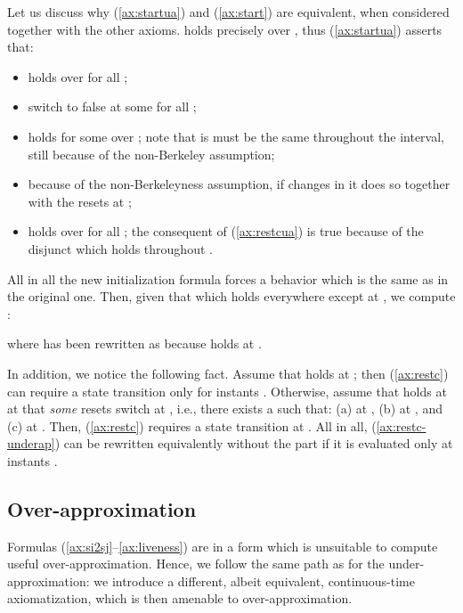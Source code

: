\documentclass[a4paper]{article}
\newcommand{\frf}[1]{(\ref{#1})}
\newcommand{\fsrf}[2]{(\ref{#1}--\ref{#2})}
\theoremstyle{plain}
\theoremstyle{definition}
\begin{document}
Let us discuss why \frf{ax:startua} and \frf{ax:start} are equivalent, when considered together with the other axioms.
 holds precisely over , thus \frf{ax:startua} asserts that:
\begin{itemize}
  \item  holds over  for all ;
  \item  switch to false at some  for all ;
  \item  holds for some  over ;
	 note that is must be the same  throughout the interval, still because of the non-Berkeley assumption;
  \item because of the non-Berkeleyness assumption, if  changes in  it does so together with the resets at ;
  \item  holds over  for all ; the consequent of \frf{ax:restcua} is true because of the disjunct  which holds throughout .
\end{itemize}
All in all the new initialization formula forces a behavior which is the same as in the original one.
Then, given that  which holds everywhere except at , we compute :

where  has been rewritten as  because  holds at .

In addition, we notice the following fact.
Assume that  holds at ; then \frf{ax:restc} can require a state transition only for instants .
Otherwise, assume that  holds at  at that \emph{some} resets switch at , i.e., there exists a  such that: (a)  at , (b)  at , and (c)  at .
Then, \frf{ax:restc} requires a state transition at .
All in all, \frf{ax:restc-underap} can be rewritten equivalently without the  part if it is evaluated only at instants .





\subsection{Over-ap\-prox\-i\-ma\-tion}
Formulas \fsrf{ax:si2sj}{ax:liveness} are in a form which is unsuitable to compute useful over-ap\-prox\-i\-ma\-tion.
Hence, we follow the same path as for the under-ap\-prox\-i\-ma\-tion: we introduce a different, albeit equivalent, continuous-time axiomatization, which is then amenable to over-ap\-prox\-i\-ma\-tion.
\end{document}
